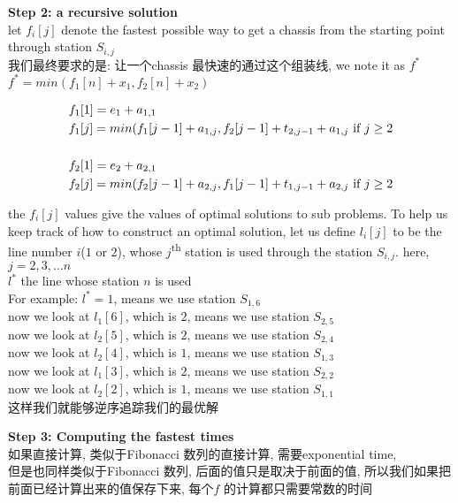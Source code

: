 \documentclass{article}
\begin{document}
\textbf{Step 2: a recursive solution}\\
let $f_i[j]$ denote the fastest possible way to get a chassis from the starting point through station $S_{i,j}$\\
我们最终要求的是: 让一个chassis 最快速的通过这个组装线, we note it as $f^*$\\
$f^* = min(f_1[n] + x_1, f_2[n] + x_2)$

$$
\begin{aligned}
& f_1[1] = e_1 + a_{1,1}\\
& f_1[j] = min(f_1[j-1] + a_{1,j}, f_2[j-1] + t_{2, j-1} + a_{1, j} \textrm{\ if } j \geq 2\\
& \\
& f_2[1] = e_2 + a_{2,1}\\
& f_2[j] = min(f_2[j-1] + a_{2,j}, f_1[j-1] + t_{1, j-1} + a_{2, j} \textrm{\ if } j \geq 2\\
\end{aligned}
$$

\noindent
the $f_i[j]$ values give the values of optimal solutions to sub problems. To help us keep track of how to construct an optimal solution, let us define $l_i[j]$ to be the line number $i$($1$ or $2$), whose $j$\textsuperscript{th} station is used through the station $S_{i,j}$. here, $j=2,3,… n$\\
$l^*$ the line whose station $n$ is used\\
For example: $l^* = 1$, means we use station $S_{1,6}$\\
now we look at $l_1[6]$, which is $2$, means we use station $S_{2,5}$\\
now we look at $l_2[5]$, which is $2$, means we use station $S_{2,4}$\\
now we look at $l_2[4]$, which is $1$, means we use station $S_{1,3}$\\
now we look at $l_1[3]$, which is $2$, means we use station $S_{2,2}$\\
now we look at $l_2[2]$, which is $1$, means we use station $S_{1,1}$\\
这样我们就能够逆序追踪我们的最优解

\textbf{Step 3: Computing the fastest times}\\
如果直接计算, 类似于Fibonacci 数列的直接计算, 需要exponential time,\\
但是也同样类似于Fibonacci 数列, 后面的值只是取决于前面的值, 所以我们如果把前面已经计算出来的值保存下来, 每个$f$ 的计算都只需要常数的时间
\end{document}

